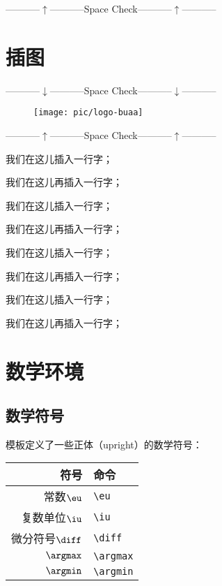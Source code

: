 \centerline{-----------$\uparrow$-----------Space Check-----------$\uparrow$-----------}


\section{插图}

\centerline{-----------$\downarrow$-----------Space Check-----------$\downarrow$-----------}
\begin{figure}[!h]
  \centering
  \texttt{[image: pic/logo-buaa]}
  \label{fig:logo}
\end{figure}
\centerline{-----------$\uparrow$-----------Space Check-----------$\uparrow$-----------}

我们在这儿插入一行字；

我们在这儿再插入一行字；

我们在这儿插入一行字；

我们在这儿再插入一行字；

我们在这儿插入一行字；

我们在这儿再插入一行字；

我们在这儿插入一行字；

我们在这儿再插入一行字；

\section{数学环境}

\subsection{数学符号}

模板定义了一些正体（upright）的数学符号：
\begin{center}
  \begin{tabular}{rl}
    \toprule
    符号            & 命令                    \\
    \midrule
    常数$\eu$       & \verb|\eu| \\
    复数单位$\iu$   & \verb|\iu| \\
    微分符号$\diff$ & \verb|\diff| \\
    $\argmax$       & \verb|\argmax| \\
    $\argmin$       & \verb|\argmin| \\
    \bottomrule
  \end{tabular}
\end{center}

